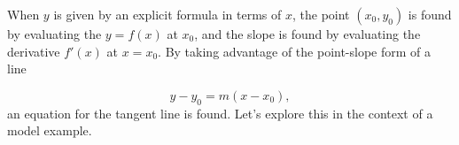 \documentclass{ximera}
\begin{document}
\begin{image}

\end{image}

When $y$ is given by an explicit formula in terms of $x$, the point $(x_0,y_0)$ is found by evaluating the $y=f(x)$ at $x_0$, and the slope is found by evaluating the derivative $f'(x)$ at $x=x_0$.  By taking advantage of the point-slope form of a line

\[
y-y_0=m\left(x-x_0\right),
\]
an equation for the tangent line is found.  Let's explore this in the context of a model example.
\end{document}
